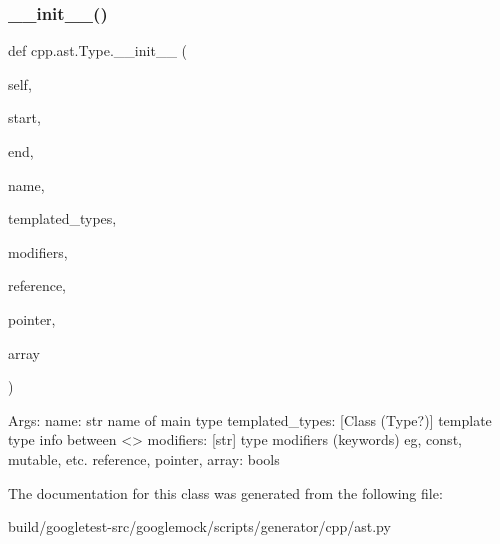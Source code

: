 \subsubsection{\texorpdfstring{\+\_\+\+\_\+init\+\_\+\+\_\+()}{\_\_init\_\_()}}
{\footnotesize\ttfamily def cpp.\+ast.\+Type.\+\_\+\+\_\+init\+\_\+\+\_\+ (\begin{DoxyParamCaption}\item[{}]{self,  }\item[{}]{start,  }\item[{}]{end,  }\item[{}]{name,  }\item[{}]{templated\+\_\+types,  }\item[{}]{modifiers,  }\item[{}]{reference,  }\item[{}]{pointer,  }\item[{}]{array }\end{DoxyParamCaption})}

\begin{DoxyVerb}Args:
  name: str name of main type
  templated_types: [Class (Type?)] template type info between <>
  modifiers: [str] type modifiers (keywords) eg, const, mutable, etc.
  reference, pointer, array: bools
\end{DoxyVerb}
 

The documentation for this class was generated from the following file\+:\begin{DoxyCompactItemize}
\item 
build/googletest-\/src/googlemock/scripts/generator/cpp/ast.\+py\end{DoxyCompactItemize}
